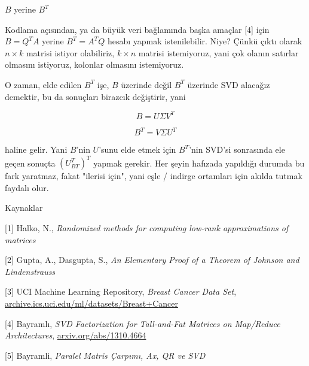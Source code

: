 \documentclass[12pt,fleqn]{article}\usepackage{../../common}
\begin{document}
$B$ yerine $B^T$

Kodlama açısından, ya da büyük veri bağlamında başka amaçlar [4] için
$B = Q^T A$ yerine $B^T = A^T Q$ hesabı yapmak istenilebilir. Niye?
Çünkü çıktı olarak $n \times k$ matrisi istiyor olabiliriz, $k \times
n$ matrisi istemiyoruz, yani çok olanın satırlar olmasını istiyoruz,
kolonlar olmasını istemiyoruz.

O zaman, elde edilen $B^T$ işe, $B$ üzerinde değil $B^T$ üzerinde SVD
alacağız demektir, bu da sonuçları birazcık değiştirir, yani

$$ B = U\Sigma V^T $$

$$ B^T = V\Sigma U^T $$

haline gelir. Yani $B$'nin $U$'sunu elde etmek için $B^T$'nin SVD'si
sonrasında ele geçen sonuçta $(U_{BT}^T)^T$ yapmak gerekir. Her şeyin
hafızada yapıldığı durumda bu fark yaratmaz, fakat "ilerisi için", yani
eşle / indirge ortamları için akılda tutmak faydalı olur.

Kaynaklar

[1] Halko, N., {\em Randomized methods for computing low-rank approximations of matrices}

[2] Gupta, A., Dasgupta, S., {\em An Elementary Proof of a Theorem of Johnson and Lindenstrauss}

[3] UCI Machine Learning Repository, 
    {\em Breast Cancer Data Set}, 
    \url{archive.ics.uci.edu/ml/datasets/Breast+Cancer}

[4] Bayramlı, {\em SVD Factorization for Tall-and-Fat Matrices on Map/Reduce Architectures}, 
    \url{arxiv.org/abs/1310.4664}

[5] Bayramli, {\em Paralel Matris Çarpımı, Ax, QR ve SVD} 
\end{document}
